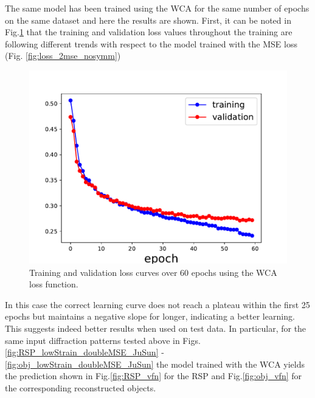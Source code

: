 The same model has been trained using the WCA for the same number of epochs on the same dataset and here the results are 
shown. First, it can be noted in Fig.\ref{fig:loss_vfn} that the training and validation loss values throughout the 
training are following different trends with respect to the model trained with the MSE loss (Fig. \ref{fig:loss_2mse_nosymm})

\begin{figure}[H]
    \centering
    \includegraphics[width=.8\textwidth]{figures/Phasing/loss_low_strain_noiseless_doubleVFN.pdf}
    \caption{Training and validation loss curves over 60 epochs using the WCA loss function.}
    \label{fig:loss_vfn}
\end{figure}

In this case the correct learning curve does not reach a plateau within the first 25 epochs but maintains a negative slope 
for longer, indicating a better learning. This suggests indeed better results when used on test data. 
In particular, for the same input diffraction patterns tested above in Figs.\ref{fig:RSP_lowStrain_doubleMSE_JuSun} - \ref{fig:obj_lowStrain_doubleMSE_JuSun}
the model trained with the WCA yields the prediction shown in Fig.\ref{fig:RSP_vfn} for the RSP and Fig.\ref{fig:obj_vfn} 
for the corresponding reconstructed objects. 

